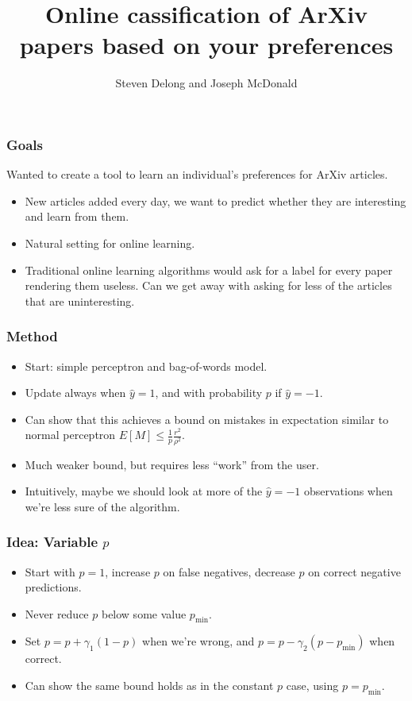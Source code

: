 \documentclass{beamer}
\title{Online cassification of ArXiv papers based on your preferences }
\author{Steven Delong and Joseph McDonald}
\begin{document}
\maketitle


\begin{frame}
  \frametitle{Goals}
  Wanted to create a tool to learn an individual's preferences for ArXiv articles.
\begin{itemize}
\item New articles added every day, we want to predict whether they are interesting and learn from them.
\item Natural setting for online learning.
\item Traditional online learning algorithms would ask for a label for every paper rendering them useless. Can we get away with asking for less of the articles that are uninteresting.
\end{itemize}


\end{frame}


\begin{frame}
\frametitle{Method}
\begin{itemize}
\item Start: simple perceptron and bag-of-words model.
\item Update always when  $\hat{y} = 1$, and with probability $p$ if $\hat{y} = -1$.
\item Can show that this achieves a bound on mistakes in expectation similar to normal perceptron $E[M] \leq \frac{1}{p}\frac{r^2}{\rho^2}$.
\item Much weaker bound, but requires less ``work'' from the user.
\item Intuitively, maybe we should look at more of the $\hat{y} = -1$ observations when we're less sure of the algorithm.
\end{itemize}
\end{frame}

\begin{frame}
  \frametitle{Idea: Variable $p$}
 
\begin{itemize}
\item Start with $p = 1$, increase $p$ on false negatives, decrease $p$ on correct negative predictions.
\item Never reduce $p$ below some value $p_\min$. 
\item Set $p = p + \gamma_1(1 - p)$ when we're wrong, and $p = p - \gamma_2(p - p_\min)$ when correct.
\item Can show the same bound holds as in the constant $p$ case, using $p = p_\min$.
\end{itemize}
\end{frame}
\end{document}
